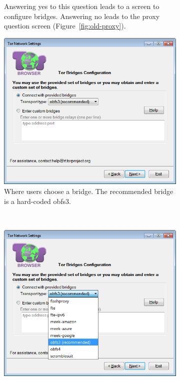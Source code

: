 \documentclass[USenglish,oneside,twocolumn]{article}
\begin{document}
\begin{figure}
\begin{subfigure}[b]{0.35\textwidth}
	\caption{Answering yes to this question leads to a screen to configure bridges. Answering no leads to the proxy question screen (Figure~\ref{fig:old-proxy}).}
	\label{fig:old-bridge}
\end{subfigure}
\begin{subfigure}[b]{0.35\textwidth}
	\includegraphics[width=\textwidth]{screenshots/OLD-bridgeSettings.png}
	\caption{Where users choose a bridge. The recommended bridge is a hard-coded obfs3.}
	\label{fig:old-bridge-settings}
\end{subfigure}
~~~~~~~~~~
\begin{subfigure}[b]{0.35\textwidth}
	\includegraphics[width=\textwidth]{screenshots/OLD-bridgeSettings-combobox.png}

\end{subfigure}
\end{figure}
\end{document}
